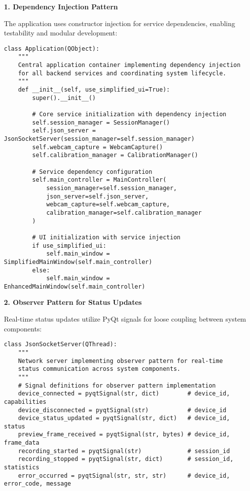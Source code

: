 \documentclass[11pt,a4paper]{article}
\begin{document}
\textbf{1. Dependency Injection Pattern}

The application uses constructor injection for service dependencies, enabling testability and modular development:

\begin{verbatim}
class Application(QObject):
    """
    Central application container implementing dependency injection
    for all backend services and coordinating system lifecycle.
    """
    def __init__(self, use_simplified_ui=True):
        super().__init__()

        # Core service initialization with dependency injection
        self.session_manager = SessionManager()
        self.json_server = JsonSocketServer(session_manager=self.session_manager)
        self.webcam_capture = WebcamCapture()
        self.calibration_manager = CalibrationManager()

        # Service dependency configuration
        self.main_controller = MainController(
            session_manager=self.session_manager,
            json_server=self.json_server,
            webcam_capture=self.webcam_capture,
            calibration_manager=self.calibration_manager
        )

        # UI initialization with service injection
        if use_simplified_ui:
            self.main_window = SimplifiedMainWindow(self.main_controller)
        else:
            self.main_window = EnhancedMainWindow(self.main_controller)
\end{verbatim}

\textbf{2. Observer Pattern for Status Updates}

Real-time status updates utilize PyQt signals for loose coupling between system components:

\begin{verbatim}
class JsonSocketServer(QThread):
    """
    Network server implementing observer pattern for real-time
    status communication across system components.
    """
    # Signal definitions for observer pattern implementation
    device_connected = pyqtSignal(str, dict)        # device_id, capabilities
    device_disconnected = pyqtSignal(str)           # device_id
    device_status_updated = pyqtSignal(str, dict)   # device_id, status
    preview_frame_received = pyqtSignal(str, bytes) # device_id, frame_data
    recording_started = pyqtSignal(str)             # session_id
    recording_stopped = pyqtSignal(str, dict)       # session_id, statistics
    error_occurred = pyqtSignal(str, str, str)      # device_id, error_code, message
\end{verbatim}
\end{document}
